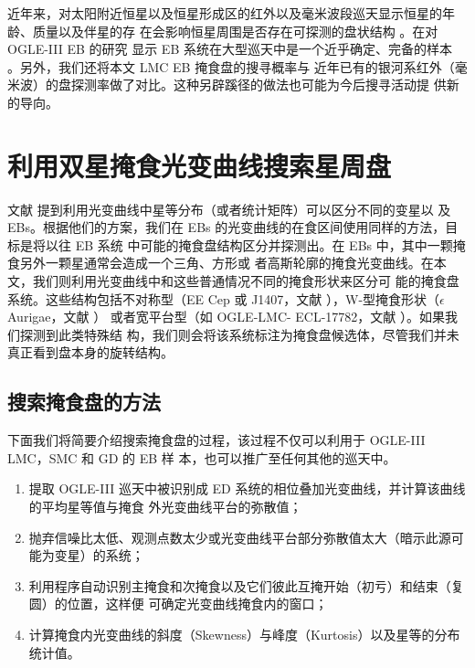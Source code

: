 近年来，对太阳附近恒星以及恒星形成区的红外以及毫米波段巡天显示恒星的年龄、质量以及伴星的存
在会影响恒星周围是否存在可探测的盘状结构
\cite{Haisch2001,Bouwman2006,Hernandez2007,Harris2012,DeRosa2013}。在对 OGLE-III EB 的研究
显示 EB 系统在大型巡天中是一个近乎确定、完备的样本
\cite{Graczyk2011,Pawlak2013,Pietrukowicz2013}。另外，我们还将本文 LMC  EB 掩食盘的搜寻概率与
近年已有的银河系红外（毫米波）的盘探测率做了对比。这种另辟蹊径的做法也可能为今后搜寻活动提
供新的导向。

\section{利用双星掩食光变曲线搜索星周盘} \label{sec:discsineb}

文献  提到利用光变曲线中星等分布（或者统计矩阵）可以区分不同的变星以
及 EBs。根据他们的方案，我们在 EBs 的光变曲线的在食区间使用同样的方法，目标是将以往 EB 系统
中可能的掩食盘结构区分并探测出。在 EBs 中，其中一颗掩食另外一颗星通常会造成一个三角、方形或
者高斯轮廓的掩食光变曲线。在本文，我们则利用光变曲线中和这些普通情况不同的掩食形状来区分可
能的掩食盘系统。这些结构包括不对称型（EE Cep 或 J1407，文献 
），W-型掩食形状（$\epsilon$ Aurigae，文献  ）
或者宽平台型（如 OGLE-LMC- ECL-17782，文献 ）。如果我们探测到此类特殊结
构，我们则会将该系统标注为掩食盘候选体，尽管我们并未真正看到盘本身的旋转结构。


\subsection{搜索掩食盘的方法} \label{sec:discebmeth}

下面我们将简要介绍搜索掩食盘的过程，该过程不仅可以利用于 OGLE-III LMC，SMC 和 GD 的 EB 样
本，也可以推广至任何其他的巡天中。

\begin{enumerate}
\item 提取 OGLE-III 巡天中被识别成 ED 系统的相位叠加光变曲线，并计算该曲线的平均星等值与掩食
外光变曲线平台的弥散值；
\item 抛弃信噪比太低、观测点数太少或光变曲线平台部分弥散值太大（暗示此源可能为变星）的系统；
\item 利用程序自动识别主掩食和次掩食以及它们彼此互掩开始（初亏）和结束（复圆）的位置，这样便
可确定光变曲线掩食内的窗口；
\item 计算掩食内光变曲线的斜度（Skewness）与峰度（Kurtosis）以及星等的分布统计值。
\end{enumerate}

